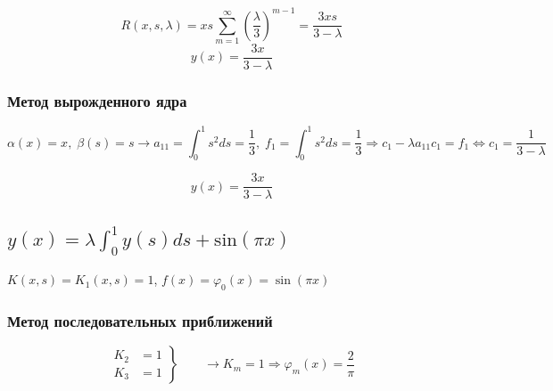 \documentclass[
11pt,
master, %
subf, %
href, %
colorlinks=true, %
times, %
]{disser}
\begin{document}
$$R(x,s,\lambda) = xs \sum_{m=1}^{\infty} \left(\frac{\lambda}{3}\right)^{m-1} = \frac{3 xs}{3 - \lambda} $$
$$y(x) = \frac{3x}{3 - \lambda}$$

\subsubsection{Метод вырожденного ядра}


$$\alpha(x) = x,\;\beta(s) = s \rightarrow a_{11} = \int_{0}^{1} s^2 ds = \frac{1}{3}, \; f_1 = \int_{0}^{1} s^2 ds = \frac{1}{3} \Rightarrow c_1 - \lambda a_{11} c_1 = f_1 \Longleftrightarrow c_1 = \frac{1}{3 - \lambda}$$

$$y(x) = \frac{3x}{3 - \lambda}$$

\subsection{$\displaystyle y(x) = \lambda \int_{0}^{1}  y(s)ds +  \mathrm{sin} (\pi x)$}

$K(x,s) = K_1(x,s) = 1$, $f(x)= \varphi_0(x) = \sin(\pi x)$

\subsubsection{Метод последовательных приближений}

\begin{equation}
 \left.\begin{aligned}
        K_2 &= 1\\
        K_3 &= 1
       \end{aligned}
 \right\}
 \qquad \longrightarrow K_m = 1 \Rightarrow \varphi_m(x) = \frac{2}{\pi}
\end{equation}
\end{document}
